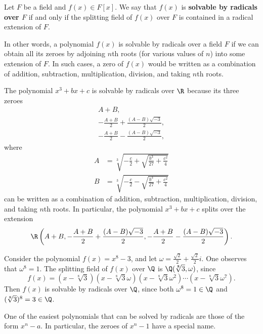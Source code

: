 \begin{definition}
    Let $F$ be a field and $f(x) \in F[x]$. We say that $f(x)$ is \textbf{solvable by radicals over $F$} if and only if the splitting field of $f(x)$ over $F$ is contained in a radical extension of $F$.
\end{definition}

In other words, a polynomial $f(x)$ is solvable by radicals over a field $F$ if we can obtain all its zeroes by adjoining $n$th roots (for various values of $n$) into some extension of $F$. In such cases, a zero of $f(x)$ would be written as a combination of addition, subtraction, multiplication, division, and taking $n$th roots.

\begin{example}
    The polynomial $x^3 + bx + c$ is solvable by radicals over $\R$ because its three zeroes
    \begin{gather*}
        A+B,\\
        -\frac{A+B}2 + \frac{(A-B)\sqrt{-3}}{2},\\
        -\frac{A+B}2 - \frac{(A-B)\sqrt{-3}}{2},
    \end{gather*}
    where
    \begin{align*}
        A &= \sqrt[3]{-\frac c2 + \sqrt{\frac{b^3}{27} + \frac{c^2}4}}\\
        B &= \sqrt[3]{-\frac c2 - \sqrt{\frac{b^3}{27} + \frac{c^2}4}}
    \end{align*}
    can be written as a combination of addition, subtraction, multiplication, division, and taking $n$th roots. In particular, the polynomial $x^3 + bx + c$ splits over the extension
    \[
        \R\left(A+B, -\frac{A+B}2 + \frac{(A-B)\sqrt{-3}}{2}, -\frac{A+B}2 - \frac{(A-B)\sqrt{-3}}{2}\right).
    \]
\end{example}

\begin{example}
    Consider the polynomial $f(x) = x^8 - 3$, and let $\omega = \frac{\sqrt2}{2} + \frac{\sqrt2}{2}i$. One observes that $\omega^8 = 1$. The splitting field of $f(x)$ over $\Q$ is $\Q(\sqrt[8]3, \omega)$, since
    \[
        f(x) = (x-\sqrt[8]3)(x-\sqrt[8]3\omega)(x-\sqrt[8]3\omega^2)\cdots(x-\sqrt[8]3\omega^7).
    \]
    Then $f(x)$ is solvable by radicals over $\Q$, since both $\omega^8 = 1 \in \Q$ and $(\sqrt[8]3)^8 = 3 \in \Q$.
\end{example}

One of the easiest polynomials that can be solved by radicals are those of the form $x^n - a$. In particular, the zeroes of $x^n - 1$ have a special name.

